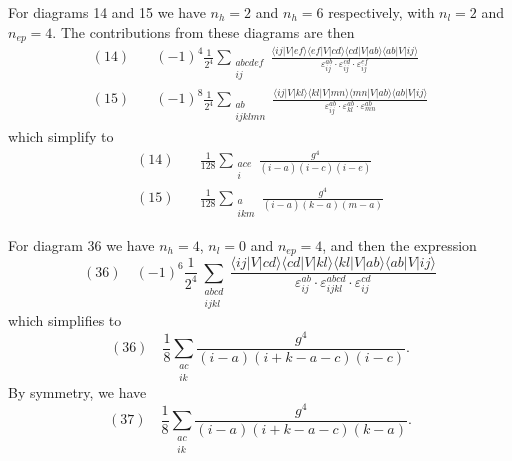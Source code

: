 For diagrams 14 and 15 we have $n_h = 2$ and $n_h = 6$ respectively, with $n_l = 2$ and $n_{ep} = 4$.
The contributions from these diagrams are then
\begin{align*}
    (14) \quad& (-1)^4 \frac{1}{2^4} \sum_{\substack{abcdef \\ ij}} \frac{
        \langle ij \vert V \vert ef \rangle
        \langle ef \vert V \vert cd \rangle
        \langle cd \vert V \vert ab \rangle
        \langle ab \vert V \vert ij \rangle
    }{
        \varepsilon_{ij}^{ab} \cdot
        \varepsilon_{ij}^{cd} \cdot
        \varepsilon_{ij}^{ef}
    } \\
    (15) \quad& (-1)^8 \frac{1}{2^4} \sum_{\substack{ab \\ ijklmn}} \frac{
        \langle ij \vert V \vert kl \rangle
        \langle kl \vert V \vert mn \rangle
        \langle mn \vert V \vert ab \rangle
        \langle ab \vert V \vert ij \rangle
    }{
        \varepsilon_{ij}^{ab} \cdot
        \varepsilon_{kl}^{ab} \cdot
        \varepsilon_{mn}^{ab}
    }
\end{align*}
which simplify to
\begin{align*}
    (14) \quad& \frac{1}{128} \sum_{\substack{ace\\i}} \frac{
        g^4
    }{
        (i - a)(i - c)(i - e)
    } \\
    (15) \quad& \frac{1}{128} \sum_{\substack{a\\ikm}} \frac{
        g^4
    }{
        (i - a)(k - a)(m - a)
    }
\end{align*}

For diagram 36 we have $n_h = 4$, $n_l = 0$ and $n_{ep} = 4$, and then the expression
\begin{equation*}
    (36) \quad (-1)^6 \frac{1}{2^4} \sum_{\substack{abcd \\ ijkl}} \frac{
        \langle ij \vert V \vert cd \rangle
        \langle cd \vert V \vert kl \rangle
        \langle kl \vert V \vert ab \rangle
        \langle ab \vert V \vert ij \rangle
    }{
        \varepsilon_{ij}^{ab} \cdot
        \varepsilon_{ijkl}^{abcd} \cdot
        \varepsilon_{ij}^{cd}
    }
\end{equation*}
which simplifies to
\begin{equation*}
    (36) \quad \frac{1}{8} \sum_{\substack{ac\\ik}} \frac{
        g^4
    }{
        (i - a)(i + k - a - c)(i - c)
    }.
\end{equation*}
By symmetry, we have
\begin{equation*}
    (37) \quad \frac{1}{8} \sum_{\substack{ac\\ik}} \frac{
        g^4
    }{
        (i - a)(i + k - a - c)(k - a)
    }.
\end{equation*}

